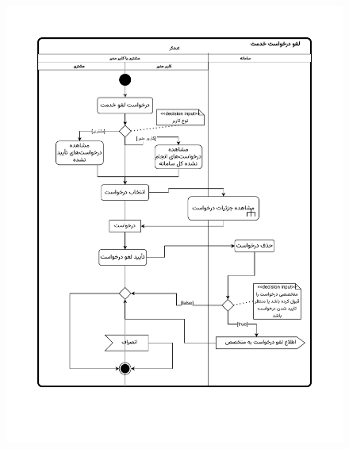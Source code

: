 \begin{figure}[ht!]
	\centering
	\includegraphics[scale=0.8, page=1]{figs/OOD-activity-cancelreq.pdf}
\end{figure}
\FloatBarrier
\newpage

